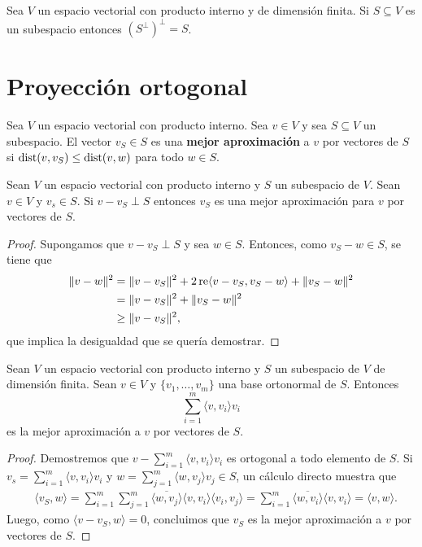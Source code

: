 \begin{xca}
	\label{xca:perpperp}
	Sea $V$ un espacio vectorial con producto interno y de dimensión finita. Si
	$S\subseteq V$ es un subespacio entonces $(S^{\perp})^{\perp}=S$. 
\end{xca}

\section{Proyección ortogonal}

\begin{block}
	Sea $V$ un espacio vectorial con producto interno. Sea $v\in V$ y sea
	$S\subseteq V$ un subespacio. El vector $v_S\in S$ es una \textbf{mejor
	aproximación} a $v$ por vectores de $S$ si $\operatorname{dist}(v,v_S)\leq\operatorname{dist}(v,w)$
	para todo $w\in S$. 
\end{block}

\begin{thm}
	\label{thm:mejor_aproximacion}
	Sean $V$ un espacio vectorial con producto interno y $S$ un subespacio de
	$V$. Sean $v\in V$ y $v_s\in S$.  Si $v-v_S\perp S$ entonces   $v_S$ es una
	mejor aproximación para $v$ por vectores de $S$. 

	\begin{proof}
		Supongamos que $v-v_S\perp S$ y sea $w\in S$. Entonces, como $v_S-w\in
		S$, se tiene que 
		\begin{align*}
			\|v-w\|^2&=\|v-v_S\|^2+2\operatorname{re}\langle v-v_S,v_S-w\rangle+\|v_S-w\|^2\\
			&=\|v-v_S\|^2+\|v_S-w\|^2\\
			&\geq \|v-v_S\|^2,
		\end{align*}
		que implica la desigualdad que se quería demostrar.
	\end{proof}
\end{thm}

\begin{cor}
	Sean $V$ un espacio vectorial con producto interno y $S$ un subespacio de
	$V$ de dimensión finita. Sean $v\in V$ y $\{v_1,\dots,v_m\}$ una base
	ortonormal de $S$. Entonces 
	\[
		\sum_{i=1}^m\langle v,v_i\rangle v_i
	\]
	es la mejor aproximación a $v$ por vectores de $S$.

	\begin{proof}
		Demostremos que $v-\sum_{i=1}^m\langle
		v,v_i\rangle v_i$ es ortogonal a todo
		elemento de $S$. Si $v_s=\sum_{i=1}^m\langle
		v,v_i\rangle v_i$ y 
		$w=\sum_{j=1}^m\langle w,v_j\rangle v_j\in S$, 
		un cálculo directo muestra que 
		\begin{align*}
			&\langle v_S,w\rangle
			=\sum_{i=1}^m\sum_{j=1}^m\overline{\langle w,v_j\rangle}\langle v,v_i\rangle\langle v_i,v_j\rangle
			=\sum_{i=1}^m\overline{\langle w,v_i\rangle}\langle v,v_i\rangle
			=\langle v,w\rangle.
		\end{align*}
		Luego, como $\langle v-v_S,w\rangle=0$, concluimos 
		que $v_S$ es la mejor aproximación a $v$ por vectores de $S$.
	\end{proof}
\end{cor}

